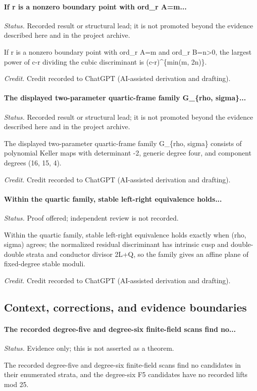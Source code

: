 \paragraph{If r is a nonzero boundary point with ord\_r A=m...}
\emph{Status.} Recorded result or structural lead; it is not promoted beyond the evidence described here and in the project archive.

If r is a nonzero boundary point with ord\_r A=m and ord\_r B=n>0, the largest power of c-r dividing the cubic discriminant is (c-r)\textasciicircum{}\{min(m, 2n)\}.

\emph{Credit.} Credit recorded to ChatGPT (AI-assisted derivation and drafting).

\label{supp-note-04-021}
\paragraph{The displayed two-parameter quartic-frame family G\_\{rho, sigma\}...}
\emph{Status.} Recorded result or structural lead; it is not promoted beyond the evidence described here and in the project archive.

The displayed two-parameter quartic-frame family G\_\{rho, sigma\} consists of polynomial Keller maps with determinant -2, generic degree four, and component degrees (16, 15, 4).

\emph{Credit.} Credit recorded to ChatGPT (AI-assisted derivation and drafting).

\label{supp-note-04-022}
\paragraph{Within the quartic family, stable left-right equivalence holds...}
\emph{Status.} Proof offered; independent review is not recorded.

Within the quartic family, stable left-right equivalence holds exactly when (rho, sigma) agrees; the normalized residual discriminant has intrinsic cusp and double-double strata and conductor divisor 2L+Q, so the family gives an affine plane of fixed-degree stable moduli.

\emph{Credit.} Credit recorded to ChatGPT (AI-assisted derivation and drafting).

\subsection{Context, corrections, and evidence boundaries}

\label{supp-note-04-023}
\paragraph{The recorded degree-five and degree-six finite-field scans find no...}
\emph{Status.} Evidence only; this is not asserted as a theorem.

The recorded degree-five and degree-six finite-field scans find no candidates in their enumerated strata, and the degree-six F5 candidates have no recorded lifts mod 25.

\endgroup
